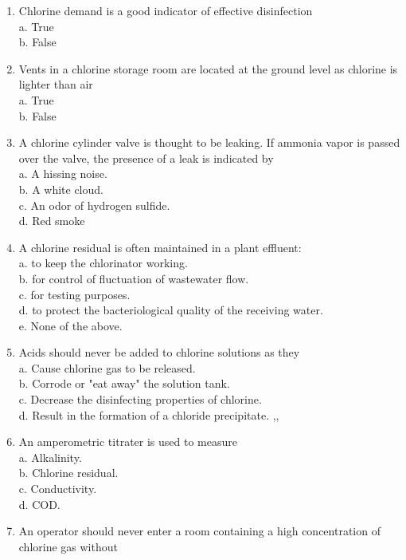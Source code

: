 \begin{tcolorbox}[breakable, enhanced,
colframe=blue!25,
colback=blue!10,
coltitle=blue!20!black,  
title= Chapter Assessment]
\begin{enumerate}
a. True \\
b. False \\
\item Chlorine demand is a good indicator of effective disinfection \\
a. True \\
b. False \\
\item Vents in a chlorine storage room are located at the ground level as chlorine is lighter than air \\
a. True \\
b. False \\
\item A chlorine cylinder valve is thought to be leaking. If ammonia vapor is passed over the valve, the presence of a leak is indicated by \\
a. A hissing noise. \\
b. A white cloud. \\
c. An odor of hydrogen sulfide. \\
d. Red smoke \\
\item A chlorine residual is often maintained in a plant effluent: \\
a. to keep the chlorinator working. \\
b. for control of fluctuation of wastewater flow. \\
c. for testing purposes. \\
d. to protect the bacteriological quality of the receiving water. \\
e. None of the above. \\
\item Acids should never be added to chlorine solutions as they \\
a. Cause chlorine gas to be released. \\
b. Corrode or "eat away" the solution tank. \\
c. Decrease the disinfecting properties of chlorine. \\
d. Result in the formation of a chloride precipitate.
,, \\
\item An amperometric titrater is used to measure \\
a. Alkalinity. \\
b. Chlorine residual. \\
c. Conductivity. \\
d. COD. \\
\item An operator should never enter a room containing a high concentration of chlorine gas without \\

\end{enumerate}
\end{tcolorbox}
